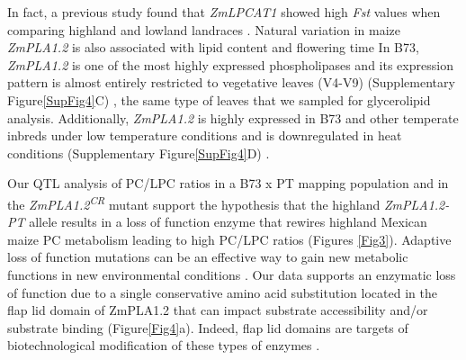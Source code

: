 \documentclass[9pt,twocolumn,twoside,lineno]{BioRxiv}
\begin{document}
In fact, a previous study found that \textit{ZmLPCAT1} showed high \textit{Fst} values when comparing highland and lowland landraces \cite{Takuno2015-uj}.
Natural variation in maize \textit{ZmPLA1.2} is also associated with lipid content \cite{Riedelsheimer2012-bx} and flowering time \cite{Chen2012-gg, Hung2012-ms} 
In B73, \textit{ZmPLA1.2} is one of the most highly expressed phospholipases and its expression pattern is almost entirely restricted to vegetative leaves (V4-V9) (Supplementary Figure\ref{SupFig4}C) \cite{Stelpflug2016-vr}, the same type of leaves that we sampled for glycerolipid analysis. 
Additionally, \textit{ZmPLA1.2} is highly expressed in B73 and other temperate inbreds under low temperature conditions and is downregulated in heat conditions (Supplementary Figure\ref{SupFig4}D) \cite{Waters2017-nat}.

Our QTL analysis of PC/LPC ratios in a B73 x PT mapping population and in the \textit{ZmPLA1.2\textsuperscript{CR}} mutant support the hypothesis that the highland \textit{ZmPLA1.2-PT} allele results in a loss of function enzyme that rewires highland Mexican maize PC metabolism leading to high PC/LPC ratios (Figures \ref{Fig3}). 
Adaptive loss of function mutations can be an effective way to gain new metabolic functions in new environmental conditions \cite{Hottes2013-np}. 
Our data supports an enzymatic loss of function due to a single conservative amino acid substitution located in the flap lid domain of ZmPLA1.2 that can impact substrate  accessibility and/or substrate binding (Figure\ref{Fig4}a). 
Indeed, flap lid domains are targets of biotechnological modification of these types of enzymes \cite{Khan2017-ua}.
\end{document}
